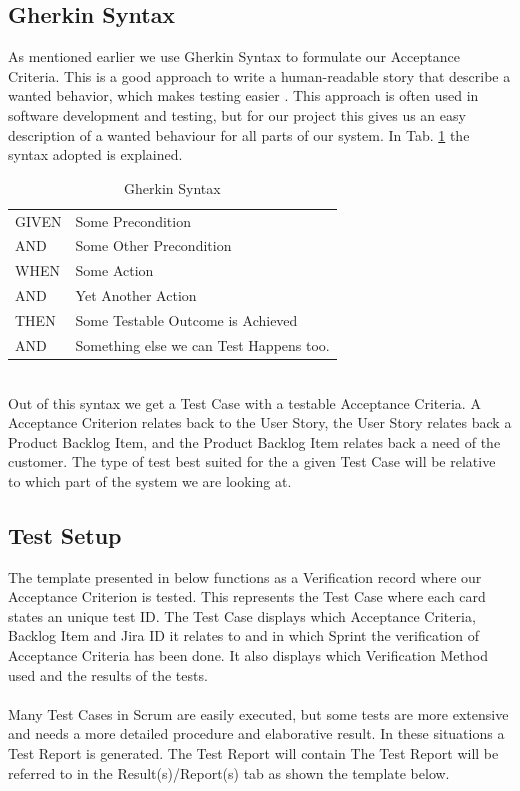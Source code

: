 \subsection{Gherkin Syntax}
As mentioned earlier we use Gherkin Syntax to formulate our Acceptance Criteria. This is a good approach to write a human-readable story that describe a wanted behavior, which makes testing easier \cite{ref7}. This approach is often used in software development and testing, but for our project this gives us an easy description of a wanted behaviour for all parts of our system. In Tab. \ref{tab:gherkin} the syntax adopted is explained. 
\begin {table}[h]
    \begin{center}
    \caption {Gherkin Syntax} 
    \label{tab:gherkin} 
    \begin{tabular}{|l|l|}\hline 
    GIVEN   &   Some Precondition \\ \rowcolor{gainsboro}
    AND    &   Some Other Precondition        \\
    WHEN    &   Some Action        \\ \rowcolor{gainsboro}
    AND    &   Yet Another Action        \\
    THEN    &   Some Testable Outcome is Achieved       \\ \rowcolor{gainsboro}
    AND    &   Something else we can Test Happens too.   \\
    \hline
    \end{tabular}
    \end{center}
\end{table}
\\
Out of this syntax we get a Test Case with a testable Acceptance Criteria. A Acceptance Criterion relates back to the User Story, the User Story relates back a Product Backlog Item, and the Product Backlog Item relates back a need of the customer. The type of test best suited for the a given Test Case will be relative to which part of the system we are looking at.\\
\newpage


\subsection {Test Setup}
The template presented in below functions as a Verification record where our Acceptance Criterion is tested. This represents the Test Case where each card states an unique test ID. The Test Case displays which Acceptance Criteria, Backlog Item and Jira ID it relates to and in which Sprint the verification of Acceptance Criteria has been done. It also displays which Verification Method used and the results of the tests.\\
\\
Many Test Cases in Scrum are easily executed, but some tests are more extensive and needs a more detailed procedure and elaborative result. In these situations a Test Report is generated. The Test Report will contain The Test Report will be referred to in the Result(s)/Report(s) tab as shown the template below. \\ 
\\
%

